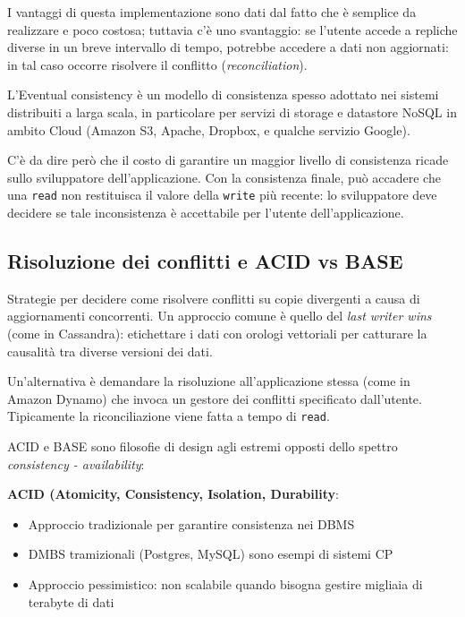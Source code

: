 I vantaggi di questa implementazione sono dati dal fatto che è semplice da realizzare e poco costosa; tuttavia c'è uno svantaggio: se l'utente accede a repliche diverse in un breve intervallo di tempo, potrebbe accedere a dati non aggiornati: in tal caso occorre risolvere il conflitto (\textit{reconciliation}).

\vspace{5mm}

L'Eventual consistency è un modello di consistenza spesso adottato nei sistemi distribuiti a larga scala, in particolare per servizi di storage e datastore NoSQL in ambito Cloud (Amazon S3, Apache, Dropbox, e qualche servizio Google).

C'è da dire però che il costo di garantire un maggior livello di consistenza ricade sullo sviluppatore dell'applicazione. Con la consistenza finale, può accadere che una \texttt{read} non restituisca il valore della \texttt{write} più recente: lo sviluppatore deve decidere se tale inconsistenza è accettabile per l'utente dell'applicazione.

\subsection{Risoluzione dei conflitti e ACID vs BASE}
Strategie per decidere come risolvere conflitti su copie divergenti a causa di aggiornamenti concorrenti.
Un approccio comune è quello del \textit{last writer wins} (come in Cassandra): etichettare i dati con orologi vettoriali per catturare la causalità tra diverse versioni dei dati.

Un'alternativa è demandare la risoluzione all'applicazione stessa (come in Amazon Dynamo) che invoca un gestore dei conflitti specificato dall'utente. Tipicamente la riconciliazione viene fatta a tempo di \texttt{read}.

\vspace{5mm}

ACID e BASE sono filosofie di design agli estremi opposti dello spettro \textit{consistency - availability}:

\textbf{ACID (Atomicity, Consistency, Isolation, Durability}:
\begin{itemize}
    \item Approccio tradizionale per garantire consistenza nei DBMS
    \item DMBS tramizionali (Postgres, MySQL) sono esempi di sistemi CP
    \item Approccio pessimistico: non scalabile quando bisogna gestire migliaia di terabyte di dati
\end{itemize}

